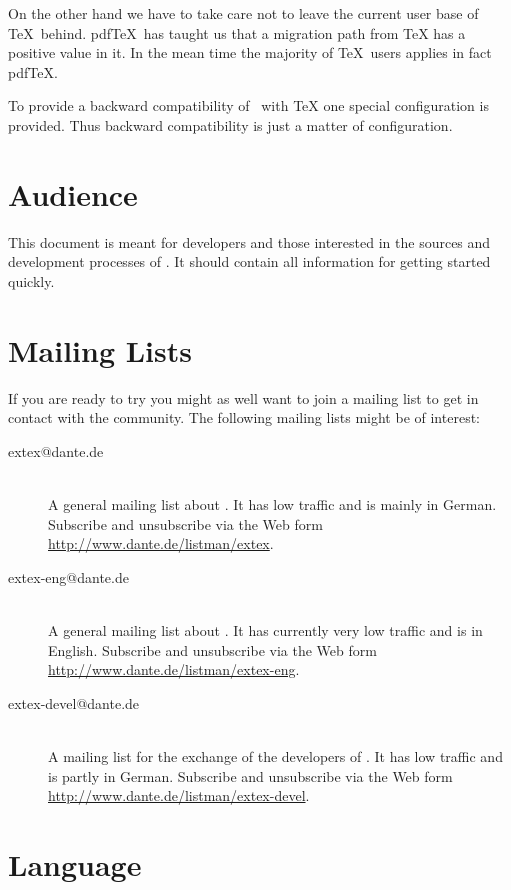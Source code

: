 \documentclass{extex-doc}
\begin{document}
On the other hand we have to take care not to leave the current user
base of \TeX\ behind. pdf\TeX\ has taught us that a migration path
from \TeX{} has a positive value in it. In the mean time
the majority of \TeX\ users applies in fact
pdf\TeX{}.

To provide a backward compatibility of \ExTeX\ with
\TeX{} one special configuration is provided. Thus
backward compatibility is just a matter of configuration.


\section{Audience}

This document is meant for developers and those interested in the
sources and development processes of \ExTeX. It should contain all
information for getting started quickly.


\section{Mailing Lists}

If you are ready to try \ExTeX{} you might as well want to join a
mailing list to get in contact with the community. The following
mailing lists might be of interest:

\begin{description}
\item[extex@dante.de] \ \\
  A general mailing list about \ExTeX. It has low traffic and is
  mainly in German. Subscribe and unsubscribe via the Web form
  \url{http://www.dante.de/listman/extex}.
\item[extex-eng@dante.de] \ \\
  A general mailing list about \ExTeX. It has currently very low
  traffic and is in English. Subscribe and unsubscribe via the Web
  form \url{http://www.dante.de/listman/extex-eng}.
\item[extex-devel@dante.de] \ \\
  A mailing list for the exchange of the developers of \ExTeX. It has
  low traffic and is partly in German. Subscribe and unsubscribe via
  the Web form \url{http://www.dante.de/listman/extex-devel}.
\end{description}


\section{Language}
\end{document}
